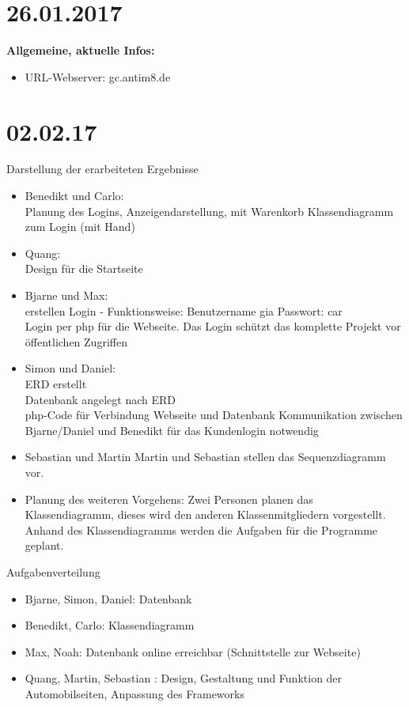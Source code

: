 \documentclass[11pt,a4paper]{scrbook}
\begin{document}
\section*{26.01.2017}
\textbf{Allgemeine, aktuelle Infos:}
\begin{itemize}
\item URL-Webserver: gc.antim8.de
\end{itemize}
\section*{02.02.17}
\Large{Darstellung der erarbeiteten Ergebnisse}
\normalsize
\begin{itemize}
\item Benedikt und Carlo: \\
Planung des Logins, Anzeigendarstellung, mit Warenkorb
Klassendiagramm zum Login (mit Hand)
\item Quang: \\
Design für die Startseite
\item Bjarne und Max: \\
erstellen Login - Funktionsweise: Benutzername gia  Passwort:  car\\
Login per php für die Webseite. Das Login schützt das komplette Projekt vor öffentlichen Zugriffen
\item Simon und Daniel: \\
ERD erstellt\\
Datenbank angelegt nach ERD \\
php-Code für Verbindung Webseite und Datenbank
Kommunikation zwischen Bjarne/Daniel und Benedikt für das Kundenlogin notwendig
\item Sebastian und Martin
Martin und Sebastian stellen das Sequenzdiagramm vor.
\item Planung des weiteren Vorgehens:
Zwei Personen planen das Klassendiagramm, dieses wird den anderen Klassenmitgliedern vorgestellt. Anhand des Klassendiagramms werden die Aufgaben für die Programme geplant.
\end{itemize}
\vspace*{1cm}
\Large{Aufgabenverteilung}
\normalsize
\begin{itemize}
\item Bjarne, Simon, Daniel: Datenbank
\item Benedikt, Carlo: Klassendiagramm
\item Max, Noah: Datenbank online erreichbar (Schnittstelle zur Webseite)
\item Quang, Martin, Sebastian : Design, Gestaltung und Funktion der Automobilseiten, Anpassung des Frameworks
\end{itemize}
\end{document}
